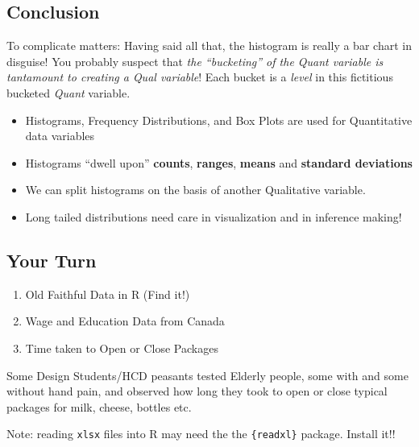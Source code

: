 \documentclass[
  letterpaper,
  DIV=11,
  numbers=noendperiod,
  oneside]{scrartcl}
\providecommand{\tightlist}{%
  \setlength{\itemsep}{0pt}\setlength{\parskip}{0pt}}
\begin{document}
\subsection{\texorpdfstring{ Conclusion}{ Conclusion}}\label{conclusion}

To complicate matters: Having said all that, the histogram is really a
bar chart in disguise! You probably suspect that \emph{the ``bucketing''
of the Quant variable is tantamount to creating a Qual variable}! Each
bucket is a \emph{level} in this fictitious bucketed \emph{Quant}
variable.

\begin{itemize}
\tightlist
\item
  Histograms, Frequency Distributions, and Box Plots are used for
  Quantitative data variables\\
\item
  Histograms ``dwell upon'' \textbf{counts}, \textbf{ranges},
  \textbf{means} and \textbf{standard deviations}
\item
  We can split histograms on the basis of another Qualitative variable.
\item
  Long tailed distributions need care in visualization and in inference
  making!
\end{itemize}

\subsection{\texorpdfstring{ Your Turn}{ Your Turn}}\label{your-turn}

\begin{enumerate}
\def\labelenumi{\arabic{enumi}.}
\tightlist
\item
  Old Faithful Data in R (Find it!)
\item
  Wage and Education Data from Canada
\item
  Time taken to Open or Close Packages
\end{enumerate}

Some Design Students/HCD peasants tested Elderly people, some with and
some without hand pain, and observed how long they took to open or close
typical packages for milk, cheese, bottles etc.

\begin{tcolorbox}[enhanced jigsaw, title=\textcolor{quarto-callout-tip-color}{\faLightbulb}\hspace{0.5em}{Tip}, coltitle=black, colbacktitle=quarto-callout-tip-color!10!white, colframe=quarto-callout-tip-color-frame, breakable, arc=.35mm, opacityback=0, left=2mm, toptitle=1mm, toprule=.15mm, opacitybacktitle=0.6, bottomtitle=1mm, rightrule=.15mm, titlerule=0mm, bottomrule=.15mm, leftrule=.75mm, colback=white]

Note: reading \texttt{xlsx} files into R may need the the
\texttt{\{readxl\}} package. Install it!!

\end{tcolorbox}
\end{document}
